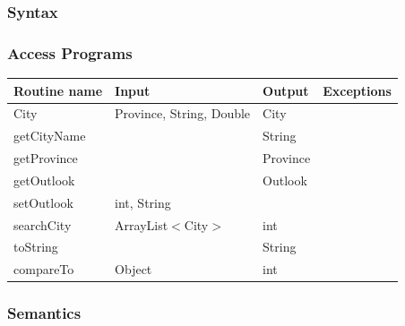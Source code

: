 \documentclass[12pt,fleqn]{article}
\begin{document}
\subsubsection* {Syntax}

\subsubsection* {Access Programs}
\begin{tabular}{| l | l | l | l |}
\hline
\textbf{Routine name} & \textbf{Input} & \textbf{Output} & \textbf{Exceptions}\\
\hline
City & Province, String, Double & City & ~\\
\hline
getCityName & ~ & String & ~\\
\hline
getProvince & ~ & Province & ~\\
\hline
getOutlook & ~ & Outlook & ~\\
\hline
setOutlook & int, String & ~ & ~\\
\hline
searchCity & ArrayList$<$City$>$ & int & ~\\
\hline
toString & ~ & String & ~\\
\hline
compareTo & Object & int & ~\\
\hline
\end{tabular}

\subsubsection*{Semantics}
\end{document}
